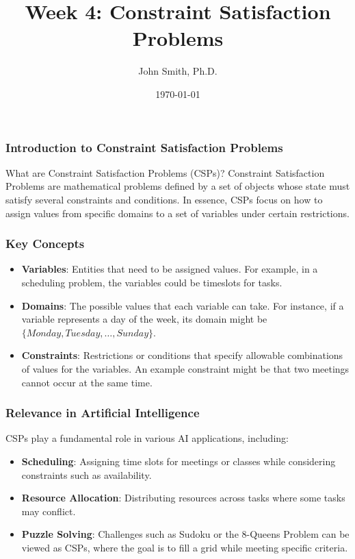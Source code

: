 \documentclass[aspectratio=169]{beamer}
\title[Week 4: CSPs]{Week 4: Constraint Satisfaction Problems}
\author[J. Smith]{John Smith, Ph.D.}
\institute[University Name]{
  Department of Computer Science\\
  University Name\\
  Email: email@university.edu\\
  Website: www.university.edu
}
\date{\today}
\begin{document}
\frame{\titlepage}

\begin{frame}[fragile]
    \titlepage
\end{frame}

\begin{frame}[fragile]
    \frametitle{Introduction to Constraint Satisfaction Problems}
    \begin{block}{What are Constraint Satisfaction Problems (CSPs)?}
        Constraint Satisfaction Problems are mathematical problems defined by a set of objects whose state must satisfy several constraints and conditions. In essence, CSPs focus on how to assign values from specific domains to a set of variables under certain restrictions.
    \end{block}
\end{frame}

\begin{frame}[fragile]
    \frametitle{Key Concepts}
    \begin{itemize}
        \item {\bf Variables}: Entities that need to be assigned values. 
        For example, in a scheduling problem, the variables could be timeslots for tasks.
        
        \item {\bf Domains}: The possible values that each variable can take. 
        For instance, if a variable represents a day of the week, its domain might be $\{Monday, Tuesday, \ldots, Sunday\}$.
        
        \item {\bf Constraints}: Restrictions or conditions that specify allowable combinations of values for the variables. 
        An example constraint might be that two meetings cannot occur at the same time.
    \end{itemize}
\end{frame}

\begin{frame}[fragile]
    \frametitle{Relevance in Artificial Intelligence}
    CSPs play a fundamental role in various AI applications, including:
    \begin{itemize}
        \item {\bf Scheduling}: Assigning time slots for meetings or classes while considering constraints such as availability.
        \item {\bf Resource Allocation}: Distributing resources across tasks where some tasks may conflict.
        \item {\bf Puzzle Solving}: Challenges such as Sudoku or the 8-Queens Problem can be viewed as CSPs, where the goal is to fill a grid while meeting specific criteria.
    \end{itemize}
\end{frame}
\end{document}
